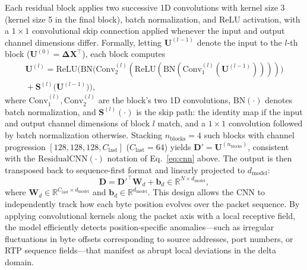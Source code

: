 Each residual block applies two successive 1D convolutions with kernel size 3 (kernel size 5 in the final block), batch normalization, and ReLU activation, with a $1\times1$ convolutional skip connection applied whenever the input and output channel dimensions differ. Formally, letting $\mathbf{U}^{(l-1)}$ denote the input to the $l$-th block ($\mathbf{U}^{(0)} = \mathbf{\Delta X}^{\top}$), each block computes
{\footnotesize
\begin{multline}
    \mathbf{U}^{(l)} = \text{ReLU}\!\Big(\text{BN}\big(\text{Conv}_2^{(l)}(\text{ReLU}(\text{BN}(\text{Conv}_1^{(l)}(\mathbf{U}^{(l-1)}))))\big) \\
    {}+ \mathbf{S}^{(l)}\big(\mathbf{U}^{(l-1)}\big)\Big),
    \label{eq:resblock}
\end{multline}
}
where $\text{Conv}_1^{(l)}, \text{Conv}_2^{(l)}$ are the block's two 1D convolutions, $\text{BN}(\cdot)$ denotes batch normalization, and $\mathbf{S}^{(l)}(\cdot)$ is the skip path: the identity map if the input and output channel dimensions of block $l$ match, and a $1\times1$ convolution followed by batch normalization otherwise. Stacking $n_{\text{blocks}} = 4$ such blocks with channel progression $[128, 128, 128, C_{\text{last}}]$ ($C_{\text{last}} = 64$) yields $\mathbf{D}' = \mathbf{U}^{(n_{\text{blocks}})}$, consistent with the $\text{ResidualCNN}(\cdot)$ notation of Eq.~\eqref{eq:cnn} above. The output is then transposed back to sequence-first format and linearly projected to $d_{\text{model}}$:
\begin{equation}
    \mathbf{D} = {\mathbf{D}'}^{\top}\mathbf{W}_d + \mathbf{b}_d \in \mathbb{R}^{N \times d_{\text{model}}},
    \label{eq:deltaproj}
\end{equation}
where $\mathbf{W}_d \in \mathbb{R}^{C_{\text{last}} \times d_{\text{model}}}$ and $\mathbf{b}_d \in \mathbb{R}^{d_{\text{model}}}$.
This design allows the CNN to independently track how each byte position evolves over the packet sequence. By applying convolutional kernels along the packet axis with a local receptive field, the model efficiently detects position-specific anomalies---such as irregular fluctuations in byte offsets corresponding to source addresses, port numbers, or RTP sequence fields---that manifest as abrupt local deviations in the delta domain.

